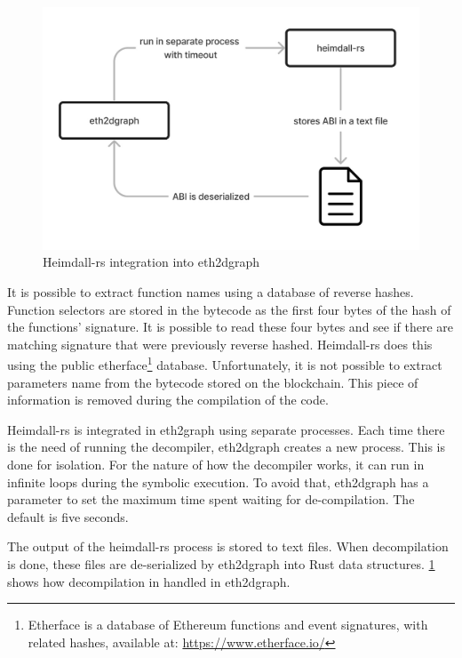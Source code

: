 \begin{figure}[!ht]
  \centering
  \includegraphics[width=1\textwidth]{Figures/methods/decompilation-architecture.jpg}
  \caption[Heimdall-rs integration into eth2dgraph]{Heimdall-rs integration into eth2dgraph}
  \label{fig:decompilation-architecture}
\end{figure}

It is possible to extract function names using a database of reverse hashes. Function selectors are stored in the bytecode as the first four bytes of the hash of the functions' signature. It is possible to read these four bytes and see if there are matching signature that were previously reverse hashed. Heimdall-rs does this using the public etherface\footnote{Etherface is a database of Ethereum functions and event signatures, with related hashes, available at: \url{https://www.etherface.io/}} database. 
Unfortunately, it is not possible to extract parameters name from the bytecode stored on the blockchain. This piece of information is removed during the compilation of the code. 

Heimdall-rs is integrated in eth2graph using separate processes. Each time there is the need of running the decompiler, eth2dgraph creates a new process. This is done for isolation. For the nature of how the decompiler works, it can run in infinite loops during the symbolic execution. To avoid that, eth2dgraph has a parameter to set the maximum time spent waiting for de-compilation. The default is  five seconds.

The output of the heimdall-rs process is stored to text files. When decompilation is done, these files are de-serialized by eth2dgraph into Rust data structures. \cref{fig:decompilation-architecture} shows how decompilation in handled in eth2dgraph.

